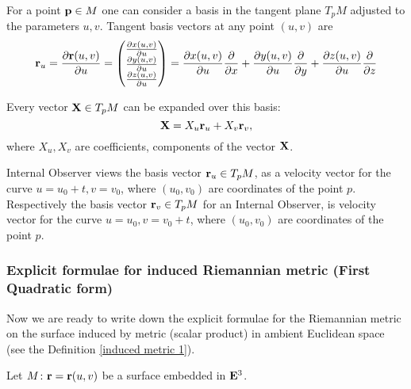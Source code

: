\documentclass[12pt]{article}
\theoremstyle{theorem}
\numberwithin{equation}{section}
\begin{document}
For a point  ${\bf p}\in M$ one can consider a basis
in the tangent plane $T_pM$ adjusted to the parameters $u,v$.
       Tangent basis vectors at any point $(u,v)$
   are
              \begin{equation*}
                {\bf r}_u={\partial {\bf r}(u,v)\over \partial u}=\begin{pmatrix}
                              {\partial x(u,v)\over \partial u}\cr
                              {\partial y(u,v)\over \partial u}\cr
                              {\partial z(u,v)\over \partial u}\cr
                              \end{pmatrix}=
                              {\partial x(u,v)\over \partial u}{\partial\over \partial x}+
                              {\partial y(u,v)\over \partial u}{\partial\over \partial y}+
                              {\partial z(u,v)\over \partial u}{\partial\over \partial z}
              \end{equation*}




 Every vector ${\bf X}\in T_pM$
can be expanded over this basis:
\begin{equation*}\label{expansion}
  {\bf X}=X_u{\bf r}_u+X_v{\bf r}_v,
\end{equation*}
where $X_u, X_v$ are coefficients, components of the vector ${\bf X}$.

Internal Observer views  the basis vector ${\bf r}_u\in T_pM$, as a  velocity vector
for the curve $u=u_0+t,v=v_0$, where $(u_0,v_0)$ are coordinates of the point $p$.
Respectively the basis vector ${\bf r}_v\in T_pM$ for an Internal Observer, is velocity vector
for the curve $u=u_0,v=v_0+t$, where $(u_0,v_0)$ are coordinates of the point $p$.



  \subsubsection {Explicit formulae for induced Riemannian metric (First Quadratic form)}

Now we are ready to write down the explicit formulae for the Riemannian metric on the surface
induced by metric (scalar product) in ambient Euclidean space (see the Definition \eqref{induced metric 1}).

     Let $M\colon {\bf r}={\bf r}(u,v)$ be a surface embedded in ${\bf E}^3$.
\end{document}
